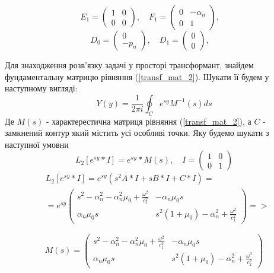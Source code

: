 \begin{equation*}
    E_1 = \begin{pmatrix}
        1 & 0 \\
        0 & 0
    \end{pmatrix}, \quad
    F_1 = \begin{pmatrix}
        0 & -\alpha_n \\
        0 & 1
    \end{pmatrix}, \quad
\end{equation*}
\begin{equation*}
    D_0 = \begin{pmatrix}
        0 \\
        -p_n
    \end{pmatrix}, \quad
    D_1 = \begin{pmatrix}
        0 \\
        0
    \end{pmatrix}, \quad
\end{equation*}

Для знаходження розв'язку задачі у просторі трансформант, знайдем фундаментальну матрицю рівняння (\ref{transf_mat_2}).
Шукати її будем у наступному вигляді:
\begin{equation}
    Y(y) = \frac{1}{2\pi i} \oint_C e^{sy} M^{-1}(s)ds
\end{equation}
Де $M(s)$ - характерестична матриця рівняння (\ref{transf_mat_2}), а $C$ - замкнений контур який містить усі особливі точки. Яку будемо шукати з наступної умовни
\begin{equation}
    L_2\left[ e^{sy}*I \right] = e^{sy} * M(s), \quad I = \begin{pmatrix} 1 & 0 \\ 0 & 1 \end{pmatrix}
\end{equation}
\begin{align*}
    &L_2\left[ e^{sy}*I \right] = e^{sy} \left( s^2A * I + s B*I + C*I \right) = \\
    &=e^{sy} \begin{pmatrix}
        s^2 - \alpha_n^2 - \alpha_n^2\mu_0 + \frac{\omega^2}{c_1^2} & -\alpha_n \mu_0 s \\
        \alpha_n \mu_0 s & s^2 (1 + \mu_0) -\alpha_n^2 + \frac{\omega^2}{c_1^2}
     \end{pmatrix} =>
\end{align*}

\begin{equation}
    M(s) = \begin{pmatrix}
        s^2 - \alpha_n^2 - \alpha_n^2\mu_0 + \frac{\omega^2}{c_1^2} & -\alpha_n \mu_0 s \\
        \alpha_n \mu_0 s & s^2 (1 + \mu_0) -\alpha_n^2 + \frac{\omega^2}{c_2^2}
     \end{pmatrix}
\end{equation}

